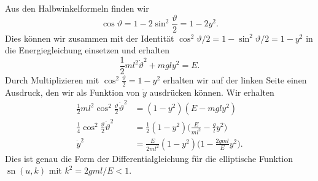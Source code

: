 Aus den Halbwinkelformeln finden wir
\[
\cos\vartheta
=
1-2\sin^2 \frac{\vartheta}2
=
1-2y^2.
\]
Dies können wir zusammen mit der
Identität $\cos^2\vartheta/2 = 1-\sin^2\vartheta/2 = 1-y^2$
in die Energiegleichung einsetzen und erhalten
\[
\frac12ml^2\dot{\vartheta}^2 + mgly^2 = E.
\]
Durch Multiplizieren mit $\cos^2\frac{\vartheta}{2}=1-y^2$
erhalten wir auf der linken Seite einen Ausdruck, den wir
als Funktion von $\dot{y}$ ausdrücken können.
Wir erhalten
\begin{align*}
\frac12ml^2
\cos^2\frac{\vartheta}2
\dot{\vartheta}^2
&=
(1-y^2)
(E -mgly^2)
\\
\frac{1}{4}\cos^2\frac{\vartheta}{2}\dot{\vartheta}^2
&=
\frac{1}{2}
(1-y^2)
\biggl(\frac{E}{ml^2} -\frac{g}{l}y^2\biggr)
\\
\dot{y}^2
&=
\frac{E}{2ml^2}
(1-y^2)\biggl(
1-\frac{2gml}{E}y^2
\biggr).
\end{align*}
Dies ist genau die Form der Differentialgleichung für die elliptische
Funktion $\operatorname{sn}(u,k)$
mit $k^2 = 2gml/E< 1$.




